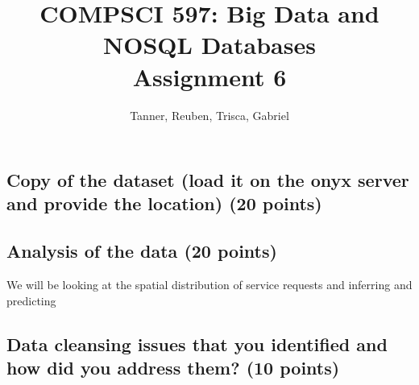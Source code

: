 \documentclass[a4paper,10pt]{article}
\title{{\large{COMPSCI 597: Big Data and NOSQL Databases}}\\Assignment 6}
\author{Tanner, Reuben, Trisca, Gabriel}
\begin{document}
\maketitle
\subsection*{Copy of the dataset (load it on the onyx server and provide the location) (20 points)}




\subsection*{Analysis of the data (20 points)}

We will be looking at the spatial distribution of service requests and inferring and predicting 




\subsection*{Data cleansing issues that you identified and how did you address them? (10 points)}
\end{document}
